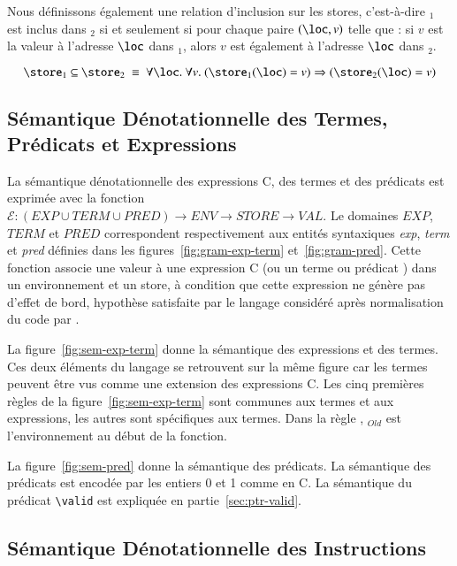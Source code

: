 Nous définissons également une relation d'inclusion sur les stores, c'est-à-dire
\store$_1$ est inclus dans \store$_2$ si et seulement si pour chaque
paire $(\loc, v)$ telle que : si $v$ est la valeur à l'adresse $\loc$
dans \store$_1$, alors $v$ est également à l'adresse $\loc$ dans \store$_2$.

\[
\mbox{\store}_1~\mbox{\subenv}~\mbox{\store}_2~\equiv~
\forall \loc.~\forall v.
~(\mbox{\store}_1(\loc)=v) \Rightarrow (\mbox{\store}_2(\loc)=v)
\]

\subsection{Sémantique Dénotationnelle des Termes, Prédicats et Expressions}



La sémantique dénotationnelle des expressions C, des termes et des prédicats
\eacsl est exprimée avec la fonction
$\mathcal{E} : (EXP \cup TERM \cup PRED) \rightarrow ENV \rightarrow STORE \rightarrow VAL$.
Le domaines $EXP$, $TERM$ et $PRED$ correspondent respectivement aux entités
syntaxiques \textit{exp}, \textit{term} et \textit{pred} définies dans les
figures~\ref{fig:gram-exp-term} et~\ref{fig:gram-pred}.
Cette fonction associe une valeur à une expression C (ou un terme ou prédicat
\eacsl) dans un environnement et un store, à condition que cette expression ne
génère pas d'effet de bord, hypothèse satisfaite par le langage considéré après
normalisation du code par \framac.

La figure~\ref{fig:sem-exp-term} donne la sémantique des expressions et des
termes.
Ces deux éléments du langage se retrouvent sur la même figure car les termes
peuvent être vus comme une extension des expressions C.
Les cinq premières règles de la figure~\ref{fig:sem-exp-term} sont communes aux
termes et aux expressions, les autres sont spécifiques aux termes.
Dans la règle , \env$_{Old}$ est l'environnement au début de la
fonction.

La figure~\ref{fig:sem-pred} donne la sémantique des prédicats.
La sémantique des prédicats est encodée par les entiers 0 et 1 comme en C.
La sémantique du prédicat \lstinline'\valid' est expliquée en
partie~\ref{sec:ptr-valid}.




\subsection{Sémantique Dénotationnelle des Instructions}

